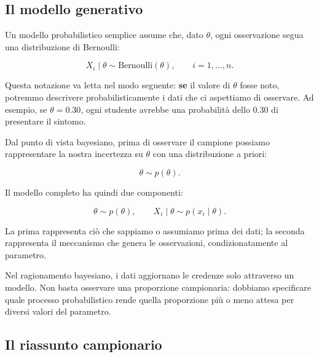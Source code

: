 \documentclass[
  italian,
  letterpaper,
  a4paper,
  11pt,
  open=any]{scrbook}
\theoremstyle{plain}
\theoremstyle{definition}
\theoremstyle{definition}
\theoremstyle{remark}
\begin{document}
\subsection{Il modello generativo}\label{il-modello-generativo}

Un modello probabilistico semplice assume che, dato \(\theta\), ogni
osservazione segua una distribuzione di Bernoulli:

\[
X_i \mid \theta \sim \text{Bernoulli}(\theta), \qquad i = 1, \dots, n.
\]

Questa notazione va letta nel modo seguente: \textbf{se} il valore di
\(\theta\) fosse noto, potremmo descrivere probabilisticamente i dati
che ci aspettiamo di osservare. Ad esempio, se \(\theta = 0.30\), ogni
studente avrebbe una probabilità dello 0.30 di presentare il sintomo.

Dal punto di vista bayesiano, prima di osservare il campione possiamo
rappresentare la nostra incertezza su \(\theta\) con una distribuzione a
priori:

\[
\theta \sim p(\theta).
\]

Il modello completo ha quindi due componenti:

\[
\theta \sim p(\theta), \qquad X_i \mid \theta \sim p(x_i \mid \theta).
\]

La prima rappresenta ciò che sappiamo o assumiamo prima dei dati; la
seconda rappresenta il meccanismo che genera le osservazioni,
condizionatamente al parametro.

\begin{tcolorbox}[enhanced jigsaw, arc=.35mm, bottomrule=.15mm, bottomtitle=1mm, breakable, colback=white, colbacktitle=quarto-callout-note-color!10!white, colframe=quarto-callout-note-color-frame, coltitle=black, left=2mm, leftrule=.75mm, opacityback=0, opacitybacktitle=0.6, rightrule=.15mm, title=\textcolor{quarto-callout-note-color}{\faInfo}\hspace{0.5em}{Idea chiave}, titlerule=0mm, toprule=.15mm, toptitle=1mm]

Nel ragionamento bayesiano, i dati aggiornano le credenze solo
attraverso un modello. Non basta osservare una proporzione campionaria:
dobbiamo specificare quale processo probabilistico rende quella
proporzione più o meno attesa per diversi valori del parametro.

\end{tcolorbox}

\subsection{Il riassunto campionario}\label{il-riassunto-campionario}
\end{document}
